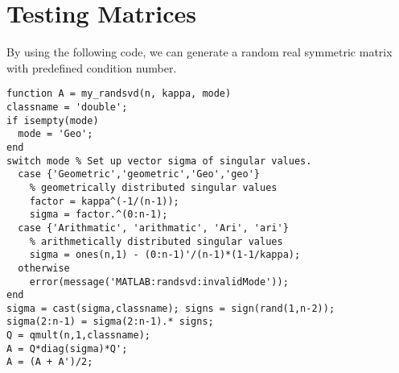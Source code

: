 \section{Testing Matrices}\label{app:myrandsvd}
By using the following code, we can generate a random real symmetric matrix with predefined condition number.
\begin{lstlisting}
function A = my_randsvd(n, kappa, mode)
classname = 'double';
if isempty(mode)
  mode = 'Geo';
end
switch mode % Set up vector sigma of singular values.
  case {'Geometric','geometric','Geo','geo'} 
    % geometrically distributed singular values
    factor = kappa^(-1/(n-1));
    sigma = factor.^(0:n-1);
  case {'Arithmatic', 'arithmatic', 'Ari', 'ari'}
    % arithmetically distributed singular values
    sigma = ones(n,1) - (0:n-1)'/(n-1)*(1-1/kappa);
  otherwise
    error(message('MATLAB:randsvd:invalidMode'));
end
sigma = cast(sigma,classname); signs = sign(rand(1,n-2)); 
sigma(2:n-1) = sigma(2:n-1).* signs; 
Q = qmult(n,1,classname);
A = Q*diag(sigma)*Q';
A = (A + A')/2;
\end{lstlisting}

